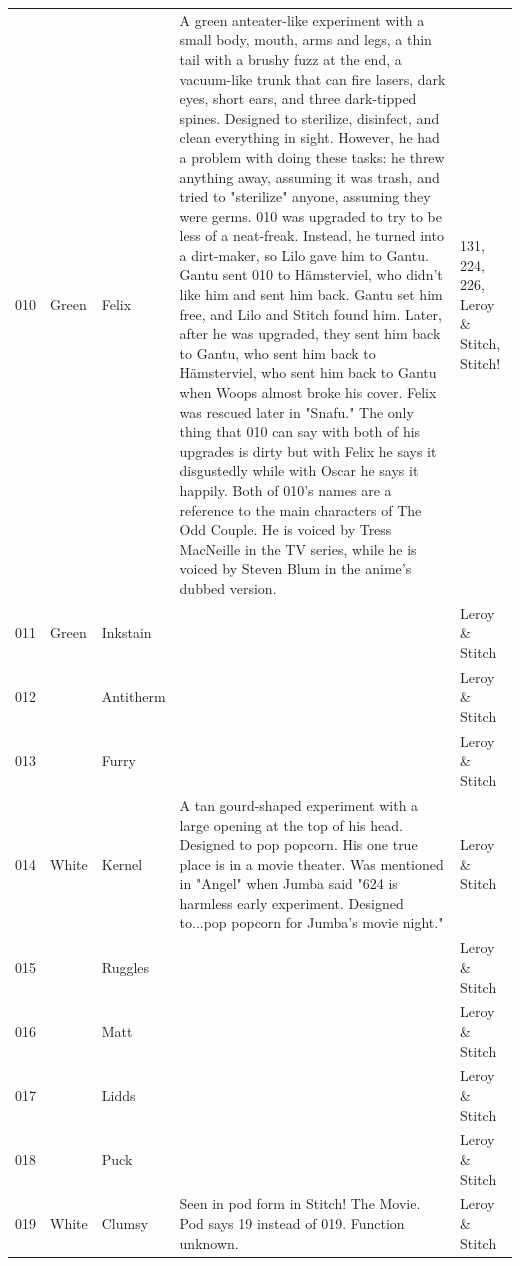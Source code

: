 \documentclass{article}
\begin{document}
\begin{tabular}{lllll}
010 & Green & Felix & A green anteater-like experiment with a small body, mouth, arms and legs, a thin tail with a brushy fuzz at the end, a vacuum-like trunk that can fire lasers, dark eyes, short ears, and three dark-tipped spines. Designed to sterilize, disinfect, and clean everything in sight. However, he had a problem with doing these tasks: he threw anything away, assuming it was trash, and tried to "sterilize" anyone, assuming they were germs. 010 was upgraded to try to be less of a neat-freak. Instead, he turned into a dirt-maker, so Lilo gave him to Gantu. Gantu sent 010 to Hämsterviel, who didn't like him and sent him back. Gantu set him free, and Lilo and Stitch found him. Later, after he was upgraded, they sent him back to Gantu, who sent him back to Hämsterviel, who sent him back to Gantu when Woops almost broke his cover. Felix was rescued later in "Snafu." The only thing that 010 can say with both of his upgrades is dirty but with Felix he says it disgustedly while with Oscar he says it happily. Both of 010's names are a reference to the main characters of The Odd Couple. He is voiced by Tress MacNeille in the TV series, while he is voiced by Steven Blum in the anime's dubbed version. & 131, 224, 226, Leroy \& Stitch, Stitch! \\
011 & Green & Inkstain &  & Leroy \& Stitch \\
012 &  & Antitherm &  & Leroy \& Stitch \\
013 &  & Furry &  & Leroy \& Stitch \\
014 & White & Kernel & A tan gourd-shaped experiment with a large opening at the top of his head. Designed to pop popcorn. His one true place is in a movie theater. Was mentioned in "Angel" when Jumba said "624 is harmless early experiment. Designed to...pop popcorn for Jumba's movie night." & Leroy \& Stitch \\
015 &  & Ruggles &  & Leroy \& Stitch \\
016 &  & Matt &  & Leroy \& Stitch \\
017 &  & Lidds &  & Leroy \& Stitch \\
018 &  & Puck &  & Leroy \& Stitch \\
019 & White & Clumsy & Seen in pod form in Stitch! The Movie. Pod says 19 instead of 019. Function unknown. & Leroy \& Stitch \\

\end{tabular}
\end{document}
